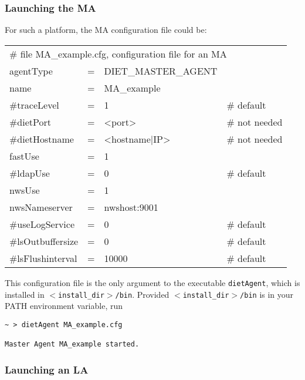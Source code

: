 \subsubsection{Launching the MA}

For such a platform, the MA configuration file could be:
\tt
\begin{center}
 \footnotesize
 \begin{tabular}{lcll}
  \multicolumn{4}{l}{\# file MA\_example.cfg, configuration file for an MA}\\
  agentType     &=&DIET\_MASTER\_AGENT&\\
  name          &=&MA\_example        &\\
  \#traceLevel  &=&1                  &\# default\\
  \#dietPort    &=&<port>             &\# not needed\\
  \#dietHostname&=&<hostname|IP>      &\# not needed\\
  fastUse       &=&1                  &\\
  \#ldapUse     &=&0                  &\# default\\
  nwsUse        &=&1                  &\\
  nwsNameserver &=&nwshost:9001       &\\
  \#useLogService &=& 0               &\# default\\
  \#lsOutbuffersize &=& 0             &\# default\\
  \#lsFlushinterval &=& 10000           &\# default\\
 \end{tabular}
\end{center}
\rm

This configuration file is the only argument to the executable
\texttt{dietAgent}, which is installed in
\texttt{$<$install\_dir$>$/bin}. Provided
\texttt{$<$install\_dir$>$/bin} is in your PATH environment variable, run
{\footnotesize
\begin{verbatim}
~ > dietAgent MA_example.cfg

Master Agent MA_example started.
\end{verbatim}
}


\subsubsection{Launching an LA}

